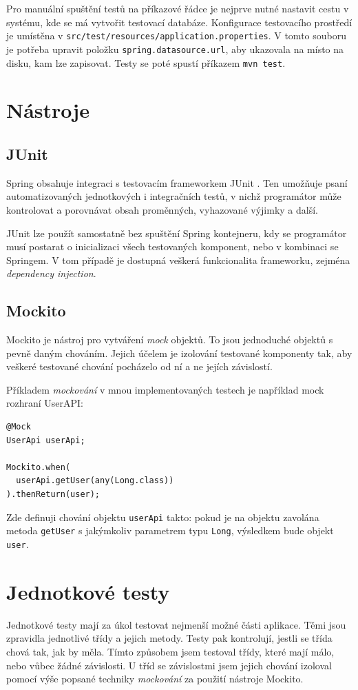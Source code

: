 \documentclass[thesis=B,czech]{FITthesis}[2012/06/26]
\begin{document}
	Pro manuální spuštění testů na příkazové řádce je nejprve nutné nastavit cestu v systému, kde se má vytvořit testovací databáze. Konfigurace testovacího prostředí je umístěna v \texttt{src/test/resources/application.properties}. V tomto souboru je potřeba upravit položku \texttt{spring.datasource.url}, aby ukazovala na místo na disku, kam lze zapisovat. Testy se poté spustí příkazem \texttt{mvn test}.
	
	\section{Nástroje}
		\subsection{JUnit}
			Spring obsahuje integraci s testovacím frameworkem JUnit \cite{junit}. Ten umožňuje psaní automatizovaných jednotkových i integračních testů, v nichž programátor může kontrolovat a porovnávat obsah proměnných, vyhazované výjimky a další.
			
			JUnit lze použít samostatně bez spuštění Spring kontejneru, kdy se programátor musí postarat o inicializaci všech testovaných komponent, nebo v kombinaci se Springem. V tom případě je dostupná veškerá funkcionalita frameworku, zejména \textit{dependency injection}.
		
		\subsection{Mockito}
			Mockito \cite{mockito} je nástroj pro vytváření \textit{mock} objektů. To jsou jednoduché  objektů s pevně daným chováním. Jejich účelem je izolování testované komponenty tak, aby veškeré testované chování pocházelo od ní a ne jejích závislostí.
			
			Příkladem \textit{mockování} v mnou implementovaných testech je například mock rozhraní UserAPI:
			\begin{Verbatim}
@Mock
UserApi userApi;

Mockito.when(
  userApi.getUser(any(Long.class))
).thenReturn(user);
			\end{Verbatim}
			Zde definuji chování objektu \texttt{userApi} takto: pokud je na objektu zavolána metoda \texttt{getUser} s jakýmkoliv parametrem typu \texttt{Long}, výsledkem bude objekt \texttt{user}.
		
		
	\section{Jednotkové testy}
		Jednotkové testy mají za úkol testovat nejmenší možné části aplikace. Těmi jsou zpravidla jednotlivé třídy a jejich metody. Testy pak kontrolují, jestli se třída chová tak, jak by měla. Tímto způsobem jsem testoval třídy, které mají málo, nebo vůbec žádné závislosti. U tříd se závislostmi jsem jejich chování izoloval pomocí výše popsané techniky \textit{mockování} za použití nástroje Mockito. 
		
\end{document}
